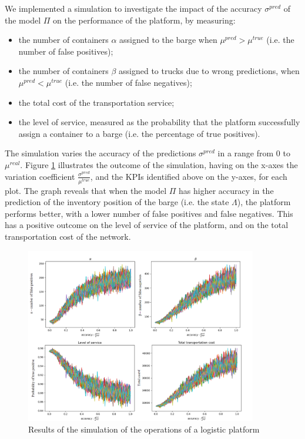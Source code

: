 We implemented a simulation to investigate the impact of the accuracy $\sigma^{pred}$ of the model $\Pi$ on the performance of the platform, by measuring:


\begin{itemize}
    \item the number of containers $\alpha$ assigned to the barge when $\mu^{pred}>\mu^{true}$ (i.e. the number of false positives);
    \item the number of containers $\beta$ assigned to trucks due to wrong predictions, when $\mu^{pred}<\mu^{true}$ (i.e. the number of false negatives);
    \item the total cost of the transportation service;
    \item the level of service, measured as the probability that the platform successfully assign a container to a barge (i.e. the percentage of true positives).
    
\end{itemize}


The simulation varies the accuracy of the predictions $\sigma^{pred}$ in a range from 0 to $\mu^{real}$. Figure \ref{fig_synchromodality} illustrates the outcome of the simulation, having on the x-axes the variation coefficient $\frac{\sigma^{pred}}{\mu^{true}}$, and the KPIs identified above on the y-axes, for each plot. The graph reveals that when the model $\Pi$ has higher accuracy in the prediction of the inventory position of the barge (i.e. the state $\Lambda$), the platform performs better, with a lower number of false positives and false negatives. This has a positive outcome on the level of service of the platform, and on the total transportation cost of the network.



\begin{figure}[hbt!]
\centering
\includegraphics[width=0.9\textwidth]{SectionDistribution/control_figures/fig_synchromodality.png}
\captionsetup{type=figure}
\caption{Results of the simulation of the operations of a logistic platform}
\label{fig_synchromodality}
\end{figure}



